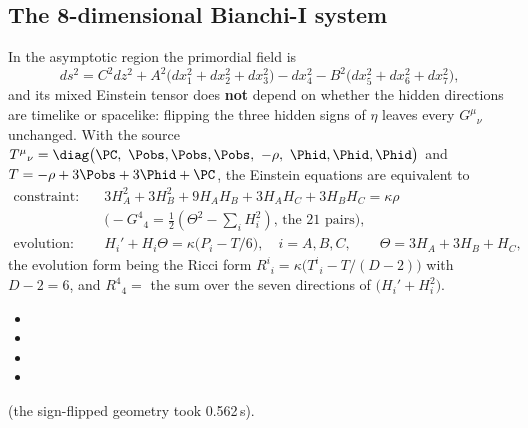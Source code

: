 \subsection{The 8-dimensional Bianchi-I system}
\label{sec:5.4}

In the asymptotic region the primordial field is
\[
  ds^2=C^2dz^2+A^2\bigl(dx_1^2+dx_2^2+dx_3^2\bigr)-dx_4^2-B^2\bigl(dx_5^2+dx_6^2+dx_7^2\bigr),
\]
and its mixed Einstein tensor does \textbf{not} depend on whether the hidden directions are timelike or
spacelike: flipping the three hidden signs of $\eta$ leaves every $G^\mu{}_\nu$ unchanged. With the
source $T^\mu{}_\nu=\diag\bigl(\PC,\ \Pobs,\Pobs,\Pobs,\ -\rho,\ \Phid,\Phid,\Phid\bigr)$ and
$T=-\rho+3\Pobs+3\Phid+\PC$, the Einstein equations are equivalent to
\begin{align*}
  \text{constraint:}&\quad 3H_A^2+3H_B^2+9H_AH_B+3H_AH_C+3H_BH_C=\kappa\rho\\
  &\quad\bigl(-G^4{}_4=\tfrac12(\Theta^2-\textstyle\sum_iH_i^2)\text{, the 21 pairs}\bigr),\\
  \text{evolution:}&\quad H_i'+H_i\Theta=\kappa\bigl(P_i-T/6\bigr),\quad i=A,B,C,\qquad \Theta=3H_A+3H_B+H_C,
\end{align*}
the evolution form being the Ricci form $R^i{}_i=\kappa\bigl(T^i{}_i-T/(D-2)\bigr)$ with $D-2=6$, and
$R^4{}_4=$ the sum over the seven directions of $\bigl(H_i'+H_i^2\bigr)$. 
\begin{itemize}
  \item {}
  \item {}
  \item {}
  \item {}
\end{itemize}
(the sign-flipped geometry took 0.562\,s).

